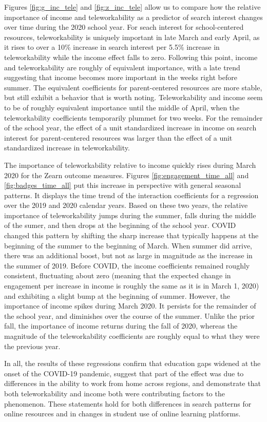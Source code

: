 	Figures \ref{fig:g_inc_tele} and \ref{fig:z_inc_tele} allow us to compare how the relative importance of income and teleworkability as a predictor of search interest changes over time during the 2020 school year. For seach interest for school-centered resources, teleworkability is uniquely important in late March and early April, as it rises to over a 10\% increase in search interest per 5.5\% increase in teleworkability while the income effect falls to zero. Following this point, income and teleworkability are roughly of equivalent importance, with a late trend suggesting that income becomes more important in the weeks right before summer. The equivalent coefficients for parent-centered resources are more stable, but still exhibit a behavior that is worth noting. Teleworkability and income seem to be of roughly equivalent importance until the middle of April, when the teleworkability coefficients temporarily plummet for two weeks. For the remainder of the school year, the effect of a unit standardized increase in income on search interest for parent-centered resources was larger than the effect of a unit standardized increase in teleworkability. \par
 	The importance of teleworkability relative to income quickly rises during March 2020 for the Zearn outcome measures. Figures \ref{fig:engagement_time_all} and \ref{fig:badges_time_all} put this increase in perspective with general seasonal patterns. It displays the time trend of the interaction coefficients for a regression over the 2019 and 2020 calendar years. Based on these two years, the relative importance of teleworkability jumps during the summer, falls during the middle of the sumer, and then drops at the beginning of the school year. COVID changed this pattern by shifting the sharp increase that typically happens at the beginning of the summer to the beginning of March. When summer did arrive, there was an additional boost, but not as large in magnitude as the increase in the summer of 2019. Before COVID, the income coefficients remained roughly consistent, fluctuating about zero (meaning that the expected change in engagement per increase in income is roughly the same as it is in March 1, 2020) and exhibiting a slight bump at the beginning of summer. However, the importance of income spikes during March 2020. It persists for the remainder of the school year, and diminishes over the course of the summer. Unlike the prior fall, the importance of income returns during the fall of 2020, whereas the magnitude of the teleworkability coefficients are roughly equal to what they were the previous year. \par
In all, the results of these regressions confirm that education gaps widened at the onset of the COVID-19 pandemic, suggest that part of the effect was due to differences in the ability to work from home across regions, and demonstrate that both teleworkability and income both were contributing factors to the phenomenon. These statements hold for both differences in search patterns for online resources and in changes in student use of online learning platforms. \par

